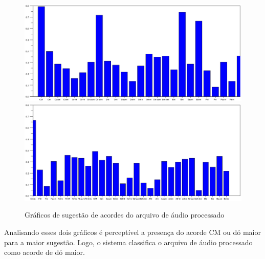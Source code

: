 \begin{figure}[h]
	\centering
		\includegraphics[keepaspectratio=true,scale=0.49]{figuras/sugestaoacordes1.eps}
		\includegraphics[keepaspectratio=true,scale=0.49]{figuras/sugestaoacordes2.eps}
	\caption{Gráficos de sugestão de acordes do arquivo de áudio processado}
\end{figure}

Analisando esses dois gráficos é perceptível a presença do acorde CM ou dó maior para a maior sugestão. Logo, o sistema classifica o arquivo de áudio processado como acorde de dó maior.